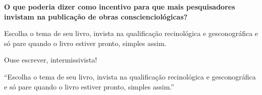 \documentclass{gescons}
\begin{document}
\begin{multicols}{2}
\textbf{O que poderia dizer como incentivo para que mais pesquisadores invistam na publicação de obras conscienciológicas?}

Escolha o tema de seu livro, invista na qualificação recinológica e gesconográfica e só pare quando o livro estiver pronto, simples assim. 

Ouse escrever, intermissivista!

\begin{pullquote}
``Escolha o tema de seu livro, invista na qualificação recinológica e gesconográfica e só pare quando o livro estiver pronto, simples assim.''
\end{pullquote}



    
    \end{multicols}
\end{document}
